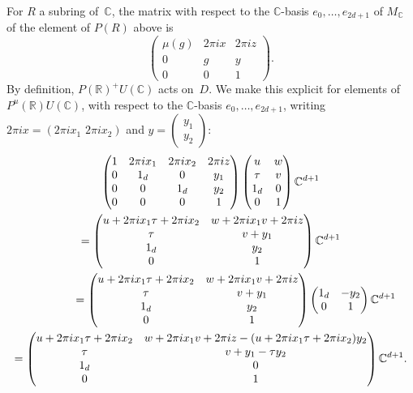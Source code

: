 \documentclass[11pt]{article}
\providecommand{\C}{}
\theoremstyle{plain}
\theoremstyle{definition}
\numberwithin{equation}{subsection}
\renewcommand{\C}{\mathbb C}
\newcommand{\R}{\mathbb R}
\begin{document}
For $R$ a subring of~$\C$, the matrix with respect to the $\C$-basis
$e_0,\ldots,e_{2d+1}$ of $M_\C$ of the element of $P(R)$ above is
\begin{equation}
\label{eq:P_element}
\begin{pmatrix}
\mu(g) & 2\pi i x & 2\pi iz\\
0 & g & y\\
0 & 0 & 1
\end{pmatrix}.
\end{equation}
By definition, $P(\R)^+U(\C)$ acts on~$D$. We make this explicit for
elements of $P^u(\R)U(\C)$, with respect to the $\C$-basis
$e_0,\ldots,e_{2d+1}$, writing $2\pi ix= (2\pi ix_1\,\, 2\pi ix_2)$ and
$y=(\substack{y_1\\ y_2})$:
\begin{multline}\label{eq:P-action}
\begin{pmatrix}
1 & 2\pi ix_1 & 2\pi ix_2 & 2\pi iz\\
0 & 1_d & 0 & y_1\\
0 & 0 & 1_d & y_2\\
0 & 0 & 0 & 1
\end{pmatrix}
\begin{pmatrix}
u & w\\ \tau & v \\ 1_d & 0\\ 0 & 1
\end{pmatrix}
\C^{d+1} \\ =
\begin{pmatrix}
u+2\pi ix_1\tau + 2\pi ix_2& w+2\pi ix_1v+2\pi iz\\
\tau & v + y_1\\ 1_d & y_2\\ 0 & 1
\end{pmatrix}
\C^{d+1} \\ \shoveright{=
\begin{pmatrix}
u+2\pi ix_1\tau + 2\pi ix_2& w+2\pi ix_1v+2\pi iz\\
\tau & v + y_1\\ 1_d & y_2\\ 0 & 1
\end{pmatrix}
\begin{pmatrix}
1_d & -y_2\\ 0 & 1
\end{pmatrix}
\C^{d+1}} \\ =
\begin{pmatrix}
u+2\pi ix_1\tau + 2\pi ix_2& w+2\pi ix_1v+2\pi iz-(u+2\pi ix_1\tau + 2\pi ix_2)y_2\\
\tau & v + y_1 -\tau y_2\\
1_d & 0
\\ 0 & 1
\end{pmatrix}
\C^{d+1}.
\end{multline}
\end{document}
